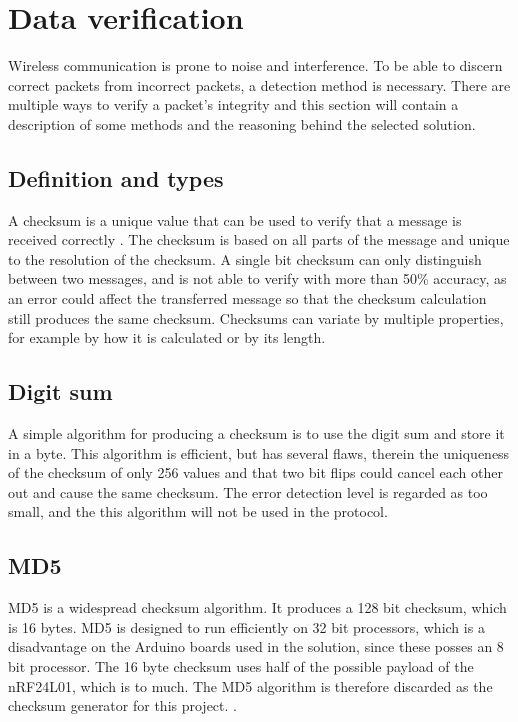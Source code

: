 \section{Data verification} \label{cha:dutuVurufucutiun}
Wireless communication is prone to noise and interference\cite{radiointerference}. To be able to discern correct packets from incorrect packets, a detection method is necessary. There are multiple ways to verify a packet's integrity and this section will contain a description of some methods and the reasoning behind the selected solution.

\subsection{Definition and types}
A checksum is a unique value that can be used to verify that a message is received correctly \cite{datapakke}. The checksum is based on all parts of the message and unique to the resolution of the checksum. 
A single bit checksum can only distinguish between two messages, and is not able to verify with more than 50\% accuracy, as an error could affect the transferred message so that the checksum calculation still produces the same checksum. Checksums can variate by multiple properties, for example by how it is calculated or by its length. 

\subsection*{Digit sum} 
A simple algorithm for producing a checksum is to use the digit sum and store it in a byte. This algorithm is efficient, but has several flaws, therein the uniqueness of the checksum of only 256 values and that two bit flips could cancel each other out and cause the same checksum. The error detection level is regarded as too small, and the this algorithm will not be used in the protocol.

\subsection*{MD5}
MD5 is a widespread checksum algorithm. It produces a 128 bit checksum, which is 16 bytes. MD5 is designed to run efficiently on 32 bit processors, which is a disadvantage on the Arduino boards used in the solution, since these posses an 8 bit processor. The 16 byte checksum uses half of the possible payload of the nRF24L01, which is to much. The MD5 algorithm is therefore discarded as the checksum generator for this project. \cite[p.~308]{boyles2010ccna}.

